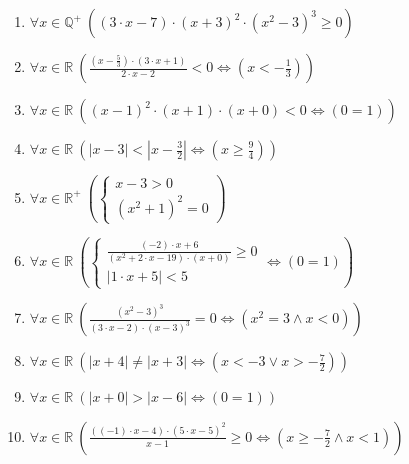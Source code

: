 \documentclass[11pt,a4paper]{article}
\begin{document}
\begin{enumerate}
\item $\displaystyle \forall x \in \mathbb{Q}^{+}\ \left( \left(3 \cdot x - 7\right) \cdot \left(x + 3\right)^{2} \cdot \left(x^{2} - 3\right)^{3} \ge 0 \right)$
\item $\displaystyle \forall x \in \mathbb{R}\ \left( \frac{\left(x - \frac{5}{3}\right) \cdot \left(3 \cdot x + 1\right)}{2 \cdot x - 2} < 0 \iff \left( x < -\frac{1}{3} \right) \right)$
\item $\displaystyle \forall x \in \mathbb{R}\ \left( \left(x - 1\right)^{2} \cdot \left(x + 1\right) \cdot \left(x + 0\right) < 0 \iff \left( 0 = 1 \right) \right)$
\item $\displaystyle \forall x \in \mathbb{R}\ \left( \left|x - 3\right| < \left|x - \frac{3}{2}\right| \iff \left( x \ge \frac{9}{4} \right) \right)$
\item $\displaystyle \forall x \in \mathbb{R}^{+}\ \left( \begin{cases} x - 3 > 0 \\ \left(x^{2} + 1\right)^{2} = 0 \end{cases} \right)$
\item $\displaystyle \forall x \in \mathbb{R}\ \left( \begin{cases} \frac{\left(-2\right) \cdot x + 6}{\left(x^{2} + 2 \cdot x - 19\right) \cdot \left(x + 0\right)} \ge 0 \\ \left|1 \cdot x + 5\right| < 5 \end{cases} \iff \left( 0 = 1 \right) \right)$
\item $\displaystyle \forall x \in \mathbb{R}\ \left( \frac{\left(x^{2} - 3\right)^{3}}{\left(3 \cdot x - 2\right) \cdot \left(x - 3\right)^{3}} = 0 \iff \left( x^{2} = 3 \land x < 0 \right) \right)$
\item $\displaystyle \forall x \in \mathbb{R}\ \left( \left|x + 4\right| \neq \left|x + 3\right| \iff \left( x < -3 \lor x > -\frac{7}{2} \right) \right)$
\item $\displaystyle \forall x \in \mathbb{R}\ \left( \left|x + 0\right| > \left|x - 6\right| \iff \left( 0 = 1 \right) \right)$
\item $\displaystyle \forall x \in \mathbb{R}\ \left( \frac{\left(\left(-1\right) \cdot x - 4\right) \cdot \left(5 \cdot x - 5\right)^{2}}{x - 1} \ge 0 \iff \left( x \ge -\frac{7}{2} \land x < 1 \right) \right)$
\end{enumerate}
\end{document}
